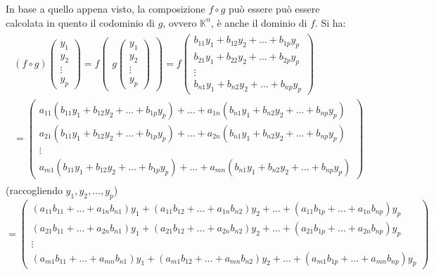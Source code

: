 \documentclass{book}
\begin{document}
In base a quello appena visto, la composizione $f\circ g$ può essere può essere calcolata in
quento il codominio di $g$, ovvero $\mathbb{K}^n$, è anche il dominio di $f$. Si ha:
\begin{eqnarray}
  \label{eq:4.20}
  \begin{matrix}
   (f\circ g)
  \begin{pmatrix}
    y_1\\
    y_2\\
    \vdots\\
    y_p
  \end{pmatrix}=f
  \begin{pmatrix}
    g
    \begin{pmatrix}
      y_1\\
      y_2\\
      \vdots\\
      y_p
    \end{pmatrix}
  \end{pmatrix}=f
  \begin{pmatrix}
    b_{11}y_1+b_{12}y_2+\dots+b_{1p}y_p\\
    b_{21}y_1+b_{22}y_2+\dots+b_{2p}y_p\\
    \vdots\\
    b_{n1}y_1+b_{n2}y_2+\dots+b_{np}y_p
  \end{pmatrix}\\=
  \begin{pmatrix}
    a_{11}(b_{11}y_1+b_{12}y_2+\dots+b_{1p}y_p) +\dots+a_{1n}(b_{n1}y_1+b_{n2}y_2+\dots+b_{np}y_p)\\ 
    a_{21}(b_{11}y_1+b_{12}y_2+\dots+b_{1p}y_p) +\dots+a_{2n}(b_{n1}y_1+b_{n2}y_2+\dots+b_{np}y_p)\\
    \vdots\\
    a_{m1}(b_{11}y_1+b_{12}y_2+\dots+b_{1p}y_p) +\dots+a_{mn}(b_{n1}y_1+b_{n2}y_2+\dots+b_{np}y_p)
  \end{pmatrix}
  \end{matrix}
\end{eqnarray}
(raccogliendo $y_1,y_2,\dots,y_p$)
\begin{equation}
  \label{eq:4.21}
  =
  \begin{pmatrix}
    (a_{11}b_{11}+\dots+a_{1n}b_{n1})y_1+(a_{11}b_{12}+\dots+a_{1n}b_{n2})y_2+\dots+(a_{11}b_{1p}+\dots+a_{1n}b_{np})y_p\\
    (a_{21}b_{11}+\dots+a_{2n}b_{n1})y_1+(a_{21}b_{12}+\dots+a_{2n}b_{n2})y_2+\dots+(a_{21}b_{1p}+\dots+a_{2n}b_{np})y_p\\
    \vdots\\
    (a_{m1}b_{11}+\dots+a_{mn}b_{n1})y_1+(a_{m1}b_{12}+\dots+a_{mn}b_{n2})y_2+\dots+(a_{m1}b_{1p}+\dots+a_{mn}b_{np})y_p
  \end{pmatrix}
\end{equation}
\end{document}

